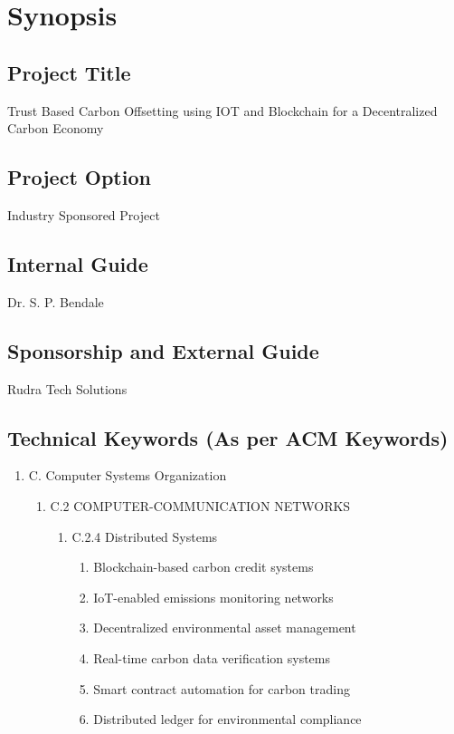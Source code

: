 \documentclass[oneside,a4paper,12pt]{book}
\begin{document}
\setlength{\parindent}{11mm}
\chapter{Synopsis}

\section{Project Title}
Trust Based Carbon Offsetting using IOT and Blockchain for a Decentralized Carbon Economy

\section{ Project Option }
Industry Sponsored Project

\section{Internal Guide}
Dr. S. P. Bendale

\section{ Sponsorship and External Guide} 
Rudra Tech Solutions

\section{Technical Keywords (As per ACM Keywords)}

\begin{enumerate}
	\item C. Computer Systems Organization 
	\begin{enumerate}
		\item C.2 COMPUTER-COMMUNICATION NETWORKS 
		\begin{enumerate}
			\item C.2.4 Distributed Systems 
			\begin{enumerate}
				\item Blockchain-based carbon credit systems
\item IoT-enabled emissions monitoring networks
\item Decentralized environmental asset management
\item Real-time carbon data verification systems
\item Smart contract automation for carbon trading
\item Distributed ledger for environmental compliance
	 		\end{enumerate} 
		\end{enumerate} 
	\end{enumerate}
\end{enumerate}
\end{document}
